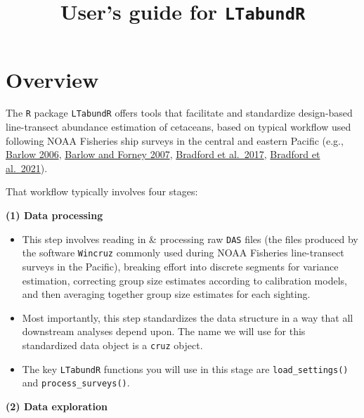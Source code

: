 \documentclass[
]{book}
\title{User's guide for \texttt{LTabundR}}
\author{}
\date{\vspace{-2.5em}}
\begin{document}
\maketitle

{
\setcounter{tocdepth}{1}
\tableofcontents
}
\hypertarget{overview}{%
\chapter*{Overview}\label{overview}}

The \texttt{R} package \texttt{LTabundR} offers tools that facilitate and standardize design-based line-transect abundance estimation of cetaceans, based on typical workflow used following NOAA Fisheries ship surveys in the central and eastern Pacific (e.g., \href{https://www.google.com/url?q=https://onlinelibrary.wiley.com/doi/10.1111/j.1748-7692.2006.00032.x\&sa=D\&source=docs\&ust=1676392605333708\&usg=AOvVaw07ERYd9m2kJg0LttBFVyil}{Barlow 2006}, \href{https://spo.nmfs.noaa.gov/content/abundance-and-population-density-cetaceans-california-current-ecosystem}{Barlow and Forney 2007}, \href{https://spo.nmfs.noaa.gov/content/fishery-bulletin/abundance-estimates-cetaceans-line-transect-survey-within-us-hawaiian}{Bradford et al.~2017}, \href{https://repository.library.noaa.gov/view/noaa/29004}{Bradford et al.~2021}).

That workflow typically involves four stages:

\textbf{(1) Data processing}

\begin{itemize}
\item
  This step involves reading in \& processing raw \texttt{DAS} files (the files produced by the software \texttt{Wincruz} commonly used during NOAA Fisheries line-transect surveys in the Pacific), breaking effort into discrete segments for variance estimation, correcting group size estimates according to calibration models, and then averaging together group size estimates for each sighting.
\item
  Most importantly, this step standardizes the data structure in a way that all downstream analyses depend upon. The name we will use for this standardized data object is a \texttt{cruz} object.
\item
  The key \texttt{LTabundR} functions you will use in this stage are \texttt{load\_settings()} and \texttt{process\_surveys()}.
\end{itemize}

\textbf{(2) Data exploration}
\end{document}
